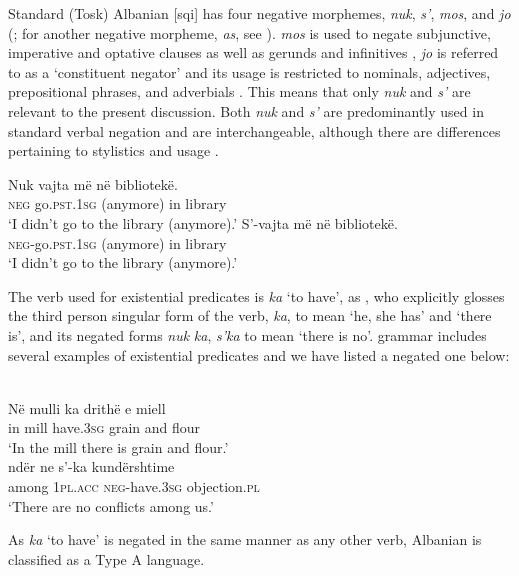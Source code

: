 ﻿\documentclass[output=paper]{langsci/langscibook}
\begin{document}
Standard (Tosk) Albanian [sqi] has four negative morphemes,
\textit{nuk}, \textit{s’}, \textit{mos}, and \textit{jo}
(\citealt[82]{Turano2000}; for another negative morpheme, \textit{as}, see
\citealt[172]{BuchholzFiedler1987}). \textit{mos} is used to negate
subjunctive, imperative and optative clauses as well as gerunds and
infinitives \citep[85]{Turano2000}, \textit{jo} is referred to as a
`constituent negator' and its usage is restricted to nominals, adjectives,
prepositional phrases, and adverbials \citep[86]{Turano2000}. This means
that only \textit{nuk} and \textit{s’} are relevant to the present
discussion. Both \textit{nuk} and \textit{s’} are predominantly used in
standard verbal negation and are interchangeable, although there are
differences pertaining to stylistics and usage \parencite[172]{BuchholzFiedler1987}. 
%
\begin{exe}\ex
{}
\begin{xlist}
\ex
    \gll Nuk vajta {\op}më{\cp} në bibliotekë.  \\
\textsc{neg}  go.\textsc{pst.1sg} (anymore) in  library \\
    \glt `I didn't go to the library (anymore).' 
\ex
\gll S’-vajta {\op}më{\cp} në bibliotekë.\\
\textsc{neg}-go.\textsc{pst}.\textsc{1sg}  (anymore) in library\\
\glt `I didn't go to the library (anymore).' 
\end{xlist}\end{exe}
%
The verb used for existential predicates is \textit{ka} `to have', as \citet[12]{Camaj1984}, who explicitly glosses the third person singular form of the verb, \textit{ka}, to mean `he, she has' and `there is', and its negated forms \textit{nuk} \textit{ka}, \textit{s’ka} to mean `there is no'.  grammar includes several examples of existential predicates and we have listed a negated one below:
%
\begin{exe}\ex
{}\\
    \gll Në  mulli ka drithë e miell \\
in mill have.\textsc{3sg} grain and flour \\
    \glt
`In the mill there is grain and flour.' 
\ex
{}\\
    \gll ndër ne s’-ka kundërshtime \\
among \textsc{1pl}.\textsc{acc}  \textsc{neg}-have.\textsc{3sg} objection.\textsc{pl} \\
    \glt `There are no conflicts among us.' 
    \end{exe}
%
As \textit{ka} `to have' is negated in the same manner as any other verb,
Albanian is classified as a Type A language. 
\end{document}
